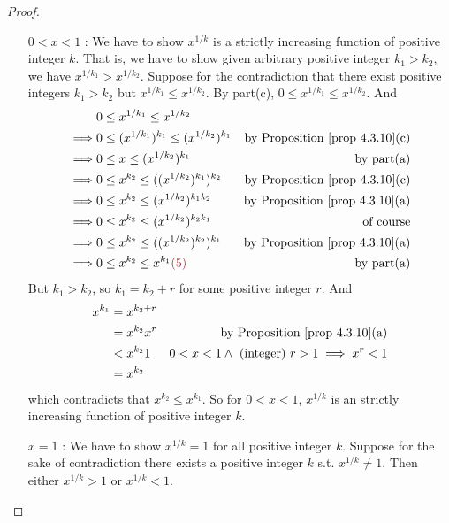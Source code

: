 \begin{proof}
\begin{enumerate}
\begin{itemize}
    \item[\(0 < x < 1\)]:
        We have to show \(x^{1/k}\) is a strictly increasing function of positive integer \(k\).
        That is, we have to show given arbitrary positive integer \(k_1 > k_2\), we have \(x^{1/k_1} > x^{1/k_2}\).
        Suppose for the contradiction that there exist positive integers \(k_1 > k_2\) but \(x^{1/k_1} \le x^{1/k_2}\).
        By part(c), \(0 \le x^{1/k_1} \le x^{1/k_2}\). And
        \begin{align*}
                     & 0 \le x^{1/k_1} \le x^{1/k_2} \\
            \implies & 0 \le (x^{1/k_1})^{k_1} \le (x^{1/k_2})^{k_1} & \text{by \PROP{4.3.10}(c)} \\
            \implies & 0 \le x \le (x^{1/k_2})^{k_1} & \text{by part(a)} \\
            \implies & 0 \le x^{k_2} \le ((x^{1/k_2})^{k_1})^{k_2} & \text{by \PROP{4.3.10}(c)} \\
            \implies & 0 \le x^{k_2} \le (x^{1/k_2})^{k_1 k_2} & \text{by \PROP{4.3.10}(a)} \\
            \implies & 0 \le x^{k_2} \le (x^{1/k_2})^{k_2 k_1} & \text{of course} \\
            \implies & 0 \le x^{k_2} \le ((x^{1/k_2})^{k_2})^{k_1} & \text{by \PROP{4.3.10}(a)} \\
            \implies & 0 \le x^{k_2} \le x^{k_1} \MAROON{(5)} & \text{by part(a)}
        \end{align*}
        But \(k_1 > k_2\), so \(k_1 = k_2 + r\) for some positive integer \(r\).
        And
        \begin{align*}
            x^{k_1} & = x^{k_2 + r} \\
                    & = x^{k_2} x^{r} & \text{by \PROP{4.3.10}(a)} \\
                    & < x^{k_2} 1 & \text{\(0 < x < 1 \land \text{ (integer) } r > 1 \implies x^r < 1\)} \\
                    & = x^{k_2}
        \end{align*}
        which contradicts  that \(x^{k_2} \le x^{k_1}\).
        So for \(0 < x < 1\), \(x^{1/k}\) is an strictly increasing function of positive integer \(k\).
    \item[\(x = 1\)]:
        We have to show \(x^{1/k} = 1\) for all positive integer \(k\).
        Suppose for the sake of contradiction there exists a positive integer \(k\) s.t. \(x^{1/k} \neq 1\). Then either \(x^{1/k} > 1\) or \(x^{1/k} < 1\).

\end{itemize}
\end{enumerate}
\end{proof}
